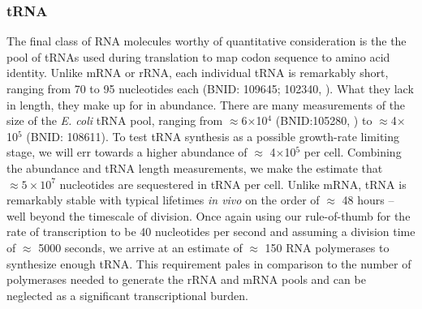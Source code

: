 \subsubsection{tRNA}
The final class of RNA molecules worthy of quantitative consideration is the the
pool of tRNAs used during translation to map codon sequence to amino acid
identity. Unlike mRNA or rRNA, each individual tRNA is remarkably short, ranging
from 70 to 95 nucleotides each (BNID: 109645; 102340, \cite{milo2010}). What
they lack in length, they make up for in abundance. There are many  measurements
of the size of the \textit{E. coli} tRNA pool, ranging from
$\approx$6$\times$10$^4$ (BNID:105280, \cite{milo2010}) to
$\approx$4$\times$10$^5$ (BNID: 108611). To test tRNA synthesis as a possible
growth-rate limiting stage, we will err towards a higher abundance of $\approx$
4$\times$10$^5$ per cell. Combining the abundance and tRNA length measurements,
we make the estimate that $\approx 5 \times 10^7$ nucleotides are sequestered in tRNA per cell.
Unlike mRNA, tRNA is remarkably stable with typical lifetimes \textit{in vivo}
on the order of $\approx$ 48 hours \citep{abelson1974,svenningsen2017} -- well
beyond the timescale of division. Once again using our rule-of-thumb for the
rate of transcription to be 40 nucleotides per second and assuming a division
time of $\approx$ 5000 seconds, we arrive at an estimate of $\approx$ 150 RNA
polymerases to synthesize enough tRNA. This requirement pales in comparison to
the number of polymerases needed to generate the rRNA and mRNA pools and can be
neglected as a significant transcriptional burden.

